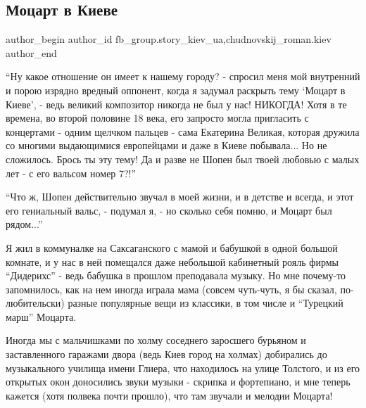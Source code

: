 
 
 
 
 
 
\subsection{Моцарт в Киеве}
\label{sec:23_11_2021.fb.fb_group.story_kiev_ua.2.mocart_v_kieve}
 
\ifcmt
 author_begin
   author_id fb_group.story_kiev_ua,chudnovskij_roman.kiev
 author_end
\fi



\enquote{Ну какое отношение он имеет к нашему городу? - спросил меня мой внутренний и
порою изрядно вредный оппонент, когда я задумал раскрыть тему \enquote{Моцарт в Киеве},
- ведь великий композитор никогда не был у нас! НИКОГДА! Хотя в те времена, во
второй половине 18 века, его запросто могла пригласить с концертами - одним
щелчком пальцев - сама Екатерина Великая, которая дружила со многими
выдающимися европейцами и даже в Киеве побывала... Но не сложилось. Брось ты
эту тему!  Да и разве не Шопен был твоей любовью с малых лет - с его вальсом
номер 7?!}

\enquote{Что ж, Шопен действительно звучал в моей жизни, и в детстве и всегда, и этот
его гениальный вальс, - подумал я, - но сколько себя помню, и Моцарт был
рядом...}

Я жил в коммуналке на Саксаганского с мамой и бабушкой в одной большой комнате,
и у нас в ней помещался даже небольшой кабинетный рояль фирмы \enquote{Дидерихс} - ведь
бабушка в прошлом преподавала музыку. Но мне почему-то запомнилось, как на нем
иногда играла мама (совсем чуть-чуть, я бы сказал, по-любительски) разные
популярные вещи из классики, в том числе и \enquote{Турецкий  марш} Моцарта.

Иногда мы с мальчишками по холму соседнего заросшего бурьяном и заставленного
гаражами двора (ведь Киев город на холмах) добирались до музыкального училища
имени Глиера, что находилось на улице Толстого, и из его открытых окон
доносились звуки музыки - скрипка и фортепиано, и мне теперь кажется (хотя
полвека почти прошло), что там звучали и мелодии Моцарта!

